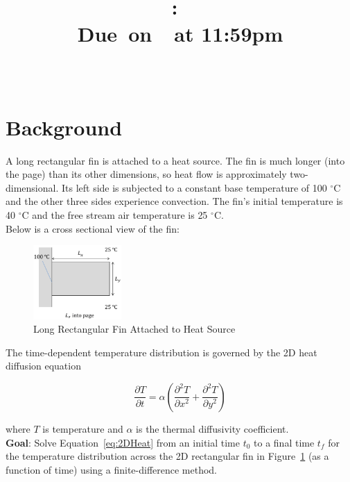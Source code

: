 \documentclass{article}
\title{
    \vspace{2in}
    \textmd{\textbf{\hmwkClass:\ \hmwkTitle}}\\
    \normalsize\vspace{0.1in}\small{Due\ on\ \hmwkDueDate\ at 11:59pm}\\
    \vspace{0.1in}\large{\textit{\hmwkClassInstructor\ \hmwkClassTime}}
    \vspace{3in}
}
\author{\hmwkAuthorName}
\date{}
\newcommand{\pderiv}[2]{\displaystyle \frac{\partial #1}{\partial #2}}
\begin{document}
\maketitle

\pagebreak

\tableofcontents

\listoffigures
\listoftables

\pagebreak

\section{Background}
A long rectangular fin is attached to a heat source. The fin is much longer (into the page) than its other
dimensions, so heat flow is approximately two-dimensional. Its left side is subjected to a constant base
temperature of 100 ${}^{\circ}$C and the other three sides experience convection. The fin's initial temperature is\\
40 ${}^{\circ}$C and the free stream air temperature is 25 ${}^{\circ}$C. \\

Below is a cross sectional view of the fin:

\begin{figure}[h]
    \centering
    \includegraphics[width=0.3\textwidth]{fig/fin.png}
    \caption{Long Rectangular Fin Attached to Heat Source}
    \label{fig:fin}
\end{figure}

The time-dependent temperature distribution is governed by the 2D heat diffusion equation

\begin{equation}
    \pderiv{T}{t} = \alpha \left( \pderiv{^2 T}{x^2} + \pderiv{^2 T}{y^2}\right)
    \label{eq:2DHeat}
\end{equation}

where $T$ is temperature and $\alpha$ is the thermal diffusivity coefficient.\\

\textbf{Goal}: Solve Equation~\eqref{eq:2DHeat} from an initial time $t_0$ to a final time $t_f$ for the temperature distribution across the 2D rectangular fin in Figure~\ref{fig:fin} (as a function of time) using a finite-difference method.\\
\end{document}
